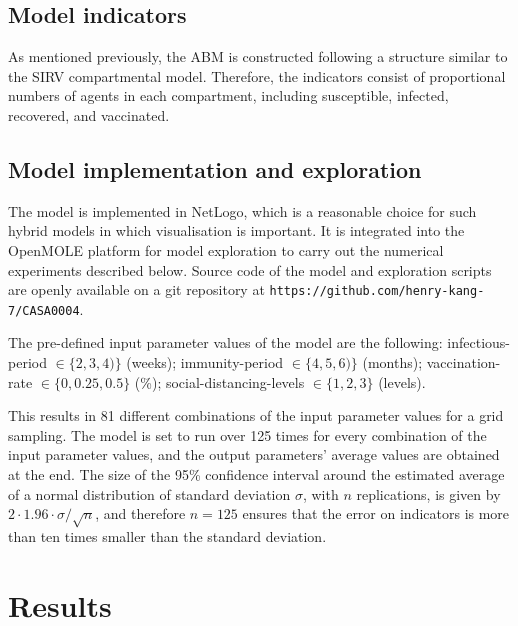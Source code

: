 \documentclass[smallextended]{svjour3}       %
\begin{document}
\subsection{Model indicators}


As mentioned previously, the ABM is constructed following a structure similar to the SIRV compartmental model. Therefore, the indicators consist of proportional numbers of agents in each compartment, including susceptible, infected, recovered, and vaccinated.






\subsection{Model implementation and exploration}

The model is implemented in NetLogo, which is a reasonable choice for such hybrid models in which visualisation is important. It is integrated into the OpenMOLE platform for model exploration \cite{reuillon2013openmole} to carry out the numerical experiments described below. Source code of the model and exploration scripts are openly available on a git repository at \texttt{https://github.com/henry-kang-7/CASA0004}.


The pre-defined input parameter values of the model are the following: infectious-period $\in \{ 2, 3, 4 )\}$ (weeks); immunity-period $\in \{ 4, 5, 6  )\}$ (months); vaccination-rate $\in \{ 0, 0.25, 0.5 \}$ (\%); social-distancing-levels $\in \{1, 2, 3\}$ (levels).

This results in 81 different combinations of the input parameter values for a grid sampling. The model is set to run over 125 times for every combination of the input parameter values, and the output parameters' average values are obtained at the end. The size of the 95\% confidence interval around the estimated average of a normal distribution of standard deviation $\sigma$, with $n$ replications, is given by $2\cdot 1.96 \cdot \sigma / \sqrt{n}$, and therefore $n=125$ ensures that the error on indicators is more than ten times smaller than the standard deviation.



\section{Results}
\end{document}
